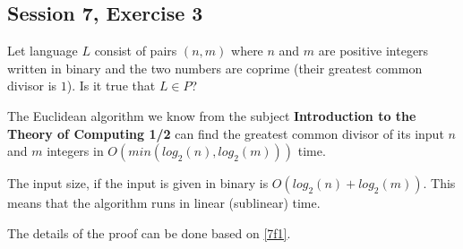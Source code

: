 \subsection {Session 7, Exercise 3}


Let language $L$ consist of pairs $(n,m)$ where $n$ and $m$ are positive integers written in binary and the two numbers are coprime (their greatest common divisor is $1$). Is it true that $L \in{} P$?


The Euclidean algorithm we know from the subject \textbf{Introduction to the Theory of Computing 1/2} can find the greatest common divisor of its input $n$ and $m$ integers in $O(min(log_2(n), log_2(m)))$ time.

The input size, if the input is given in binary is $O(log_2(n) + log_2(m))$. This means that the algorithm runs in linear (sublinear) time.

The details of the proof can be done based on \ref{7f1}.